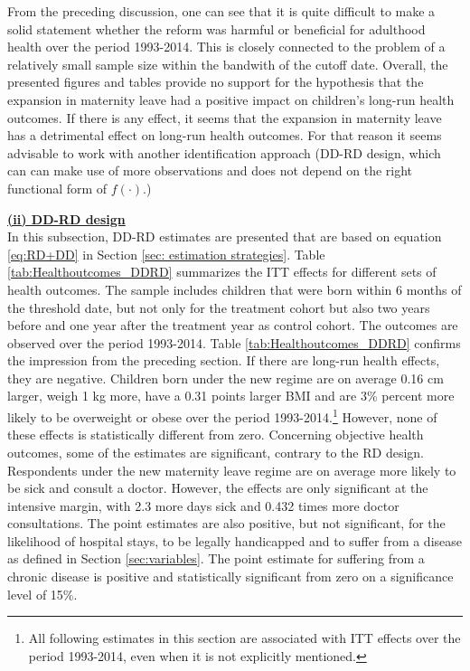 \documentclass[a4paper ]{article}
\begin{document}
From the preceding discussion, one can see that it is quite difficult to make a solid statement whether the reform was harmful or beneficial for adulthood health over the period 1993-2014. This is closely connected to the problem of a relatively small sample size within the bandwith of the cutoff date.
Overall, the presented figures and tables provide no support for the hypothesis that the expansion in maternity leave had a positive impact on children's long-run health outcomes. If there is any effect, it seems that the expansion in maternity leave has a detrimental effect on long-run health outcomes. For that reason it seems advisable to work with another identification approach (DD-RD design, which can can make use of more observations and does not depend on the right functional form of $f(\cdot)$.)

\bigskip
\underline{\textbf{(ii) DD-RD design}}\\
In this subsection, DD-RD estimates are presented that are based on equation \ref{eq:RD+DD} in Section \ref{sec: estimation strategies}. Table \ref{tab:Healthoutcomes_DDRD} summarizes the ITT effects for different sets of health outcomes. The sample includes children that were born within 6 months of the threshold date, but not only for the treatment cohort but also two years before and one year after the treatment year as control cohort. The outcomes are observed over the period 1993-2014. \newline
Table \ref{tab:Healthoutcomes_DDRD} confirms the impression from the preceding section. If there are long-run health effects, they are negative. 
Children born under the new regime are on average 0.16 cm larger, weigh 1 kg more, have a 0.31 points larger BMI and are 3\% percent more likely to be overweight or obese over the period 1993-2014.\footnote{All following estimates in this section are associated with ITT effects over the period 1993-2014, even when it is not explicitly mentioned.} However, none of these effects is statistically different from zero. 
Concerning objective health outcomes, some of the estimates are significant, contrary to the RD design. Respondents under the new maternity leave regime are on average more likely to be sick and consult a doctor. However, the effects are only significant at the intensive margin, with 2.3 more days sick and 0.432 times more doctor consultations. The point estimates are also positive, but not significant, for the likelihood of hospital stays, to be legally handicapped and to suffer from a disease as defined in Section \ref{sec:variables}. The point estimate for suffering from a chronic disease is positive and statistically significant from zero on a significance level of 15\%.
\end{document}
